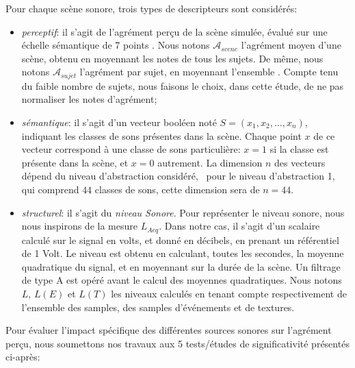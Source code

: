 \documentclass[twoside,twocolumn]{article}
\begin{document}
Pour chaque scène sonore, trois types de descripteurs sont considérés:

\begin{itemize}
\item \emph{perceptif}: il s'agit de l'agrément perçu de la scène simulée, évalué sur une échelle sémantique de 7 points . Nous notons $\mathcal{A}_{scene}$ l'agrément moyen d'une scène, obtenu en moyennant les notes de tous les sujets. De même, nous notons $\mathcal{A}_{sujet}$ l'agrément par sujet, en moyennant l'ensemble  . Compte tenu du faible nombre de sujets, nous faisons le choix, dans cette étude, de ne pas normaliser les notes d'agrément;
\item \emph{sémantique}: il s'agit d'un vecteur booléen noté $S=(x_1,x_2,\ldots,x_n)$, indiquant les classes de sons présentes dans la scène. Chaque point $x$ de ce vecteur correspond à une classe de sons particulière: $x=1$ si la classe est présente dans la scène, et $x=0$ autrement. La dimension $n$ des vecteurs dépend du niveau d'abstraction considéré, \eg~pour le niveau d'abstraction 1, qui comprend $44$ classes de sons, cette dimension sera de $n=44$.
\item \emph{structurel}: il s'agit du \emph{niveau Sonore}. Pour représenter le niveau sonore, nous nous inspirons de la mesure $L_{Aeq}$. Dans notre cas, il s'agit d'un scalaire calculé sur le signal en volts,  et donné en décibels, en prenant un référentiel de 1 Volt. Le niveau est obtenu en calculant, toutes les secondes, la moyenne quadratique du signal, et en moyennant sur la durée de la scène. Un filtrage de type A est opéré avant le calcul des moyennes quadratiques. Nous notons $L$, $L(E)$ et $L(T)$ les niveaux calculés en tenant compte respectivement de l'ensemble des samples, des samples d'événements et de textures. 
\end{itemize}

Pour évaluer l'impact spécifique des différentes sources sonores sur l'agrément perçu, nous soumettons nos travaux aux 5 tests/études de significativité présentés ci-après:
 
\end{document}
